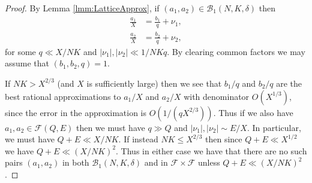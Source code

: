 \documentclass[10pt]{amsart}
\theoremstyle{plain}
\numberwithin{sblmm}{thrm}
\numberwithin{equation}{section}
\begin{document}
%
%
%
%
\begin{proof}
By Lemma \ref{lmm:LatticeApprox}, if $(a_1,a_2)\in\mathcal{B}_1(N,K,\delta)$ then
%
\begin{align*}
\frac{a_1}{X}&=\frac{b_1}{q}+\nu_1,\\
\frac{a_2}{X}&=\frac{b_2}{q}+\nu_2,
\end{align*}
%
for some $q\ll X/N K$ and $|\nu_1|,|\nu_2|\ll 1/N K q$. By clearing common factors we may assume that $(b_1,b_2,q)=1$. 

If $N K > X^{2/3}$ (and $X$ is sufficiently large) then we see that $b_1/q$ and $b_2/q$ are the best rational approximations to $a_1/X$ and $a_2/X$ with denominator $O(X^{1/3})$, since the error in the approximation is $O(1/(qX^{2/3}))$. Thus if we also have $a_1,a_2\in\mathcal{F}(Q,E)$ then we must have $q\gg Q$ and $|\nu_1|,|\nu_2|\sim E/X$. In particular, we must have $Q+E\ll X/NK$. If instead $N K\le X^{2/3}$ then since $Q+E\ll X^{1/2}$ we have $Q+E\ll (X/NK)^{2}$. Thus in either case we have that there are no such pairs $(a_1,a_2)$ in both $\mathcal{B}_1(N,K,\delta)$ and in $\mathcal{F}\times\mathcal{F}$ unless $Q+E\ll (X/NK)^2$.
\end{proof}
%
%
%
%
\end{document}
